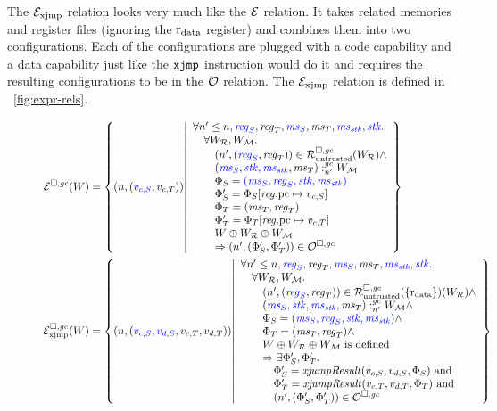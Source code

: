 \begin{jversion}
The $\mathcal{E}_\mathrm{xjmp}$ relation looks very much like the $\mathcal{E}$ relation.
It takes related memories and register files (ignoring the $\mathrm{r}_\mathrm{data}$ register) and combines them into two configurations.
Each of the configurations are plugged with a code capability and a data capability just like the $\txjmp{}{}$ instruction would do it and requires the resulting configurations to be in the $\mathcal{O}$ relation.
The $\mathcal{E}_\mathrm{xjmp}$ relation is defined in \figurename~\ref{fig:expr-rels}.
\begin{figure}
  \centering
  \begin{align*}
  \lre(W) &= \left\{ \npair{\stpair[.]{v_{c,S}}{v_{c,T}}} \middle| 
    \begin{array}{l}
      \forall n' \leq n, \src{\reg_S}, \reg_T, \src{\ms_S}, \ms_T, \src{\ms_\stk}, \src{\stk} \ldotp\\
      \quad \forall W_\lrrs , W_\lrm \ldotp \\
      \qquad\npair[n']{\stpair{\reg}{\reg}} \in \lrr(W_\lrrs) \wedge\\
      \qquad\memSat[n']{\stpair[.]{\ms_S,\stk,\ms_\stk}{\ms_T}}{W_\lrm} \\
      \qquad\Phi_S = \src{(\ms_S,\reg_S,\stk, \ms_\stk)}\\
      \qquad \Phi_S' = \Phi_S \updReg{\pcreg}{v_{c,S}}\\
      \qquad\Phi_T = (\ms_T,\reg_T)\\
      \qquad\Phi_T' = \Phi_T\updReg{\pcreg}{v_{c,T}}\\
      \qquad W \oplus W_\lrrs \oplus W_\lrm\\
      \qquad\Rightarrow\npair[n']{\left(\Phi_S', \Phi_T' \right)}\in \lro
    \end{array}
    \right\}
\\  \lrexj(W) &= \left\{ \npair{\stpair[.]{v_{c,S},v_{d,S}}{v_{c,T},v_{d,T}}} \middle| 
    \begin{array}{l}
      \forall n' \leq n, \src{\reg_S}, \reg_T, \src{\ms_S}, \ms_T, \src{\ms_\stk}, \src{\stk} \ldotp\\
      \quad \forall W_\lrrs , W_\lrm \ldotp \\
      \qquad\npair[n']{\stpair{\reg}{\reg}} \in \lrr(\{\rdata\}) (W_\lrrs ) \wedge\\
      \qquad\memSat[n']{\stpair[.]{\ms_S,\stk,\ms_\stk}{\ms_T}}{W_\lrm} \wedge \\
      \qquad\Phi_S = \src{(\ms_S,\reg_S,\stk, \ms_\stk)}\wedge\\
      \qquad\Phi_T = (\ms_T,\reg_T) \wedge\\
      \qquad W \oplus W_\lrrs \oplus W_\lrm \text{ is defined }\\
      \qquad\Rightarrow \exists \Phi_S',\Phi_T'\ldotp\\
      \quad\qquad \Phi_S' = \xjumpResult{v_{c,S}}{v_{d,S}}{\Phi_S} \tand\\
      \quad\qquad\Phi_T' = \xjumpResult{v_{c,T}}{v_{d,T}}{\Phi_T}\tand\\
      \quad\qquad\npair[n']{\left(\Phi_S', \Phi_T' \right)}\in \lro
    \end{array}
    \right\}
\end{align*}


\end{figure}
\end{jversion}
